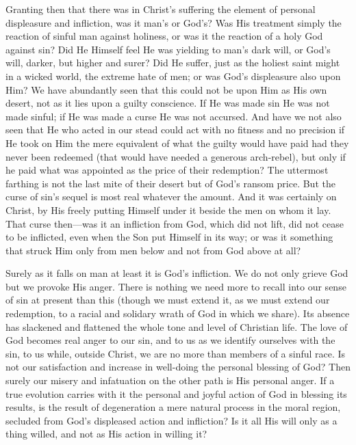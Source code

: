 \documentclass[draft]{ptfdoc}
\begin{document}
Granting then that there was in Christ's suffering the 
element of personal displeasure and infliction, was it man's 
or God's? Was His treatment simply the reaction of 
sinful man against holiness, or was it the reaction of a 
holy God against sin? Did He Himself feel He was 
yielding to man's dark will, or God's will, darker, but 
higher and surer? Did He suffer, just as the holiest 
saint might in a wicked world, the extreme hate of 
men; or was God's displeasure also upon Him? We 
have abundantly seen that this could not be upon Him as 
His own desert, not as it lies upon a guilty conscience. 
If He was made sin He was not made sinful; if He was 
made a curse He was not accursed. And have we not 
also seen that He who acted in our stead could act with 
no fitness and no precision if He took on Him the mere 
equivalent of what the guilty would have paid had they 
never been redeemed (that would have needed a generous 
arch-rebel), but only if he paid what was appointed as the 
price of their redemption? The uttermost farthing is not 
the last mite of their desert but of God's ransom price. 
But the curse of sin's sequel is most real whatever the 
amount. And it was certainly on Christ, by His freely 
putting Himself under it beside the men on whom it lay. 
That curse then---was it an infliction from God, which did 
not lift, did not cease to be inflicted, even when the Son 
put Himself in its way; or was it something that struck 
Him only from men below and not from God above 
at all? 

Surely as it falls on man at least it is God's infliction. 
We do not only grieve God but we provoke His anger. 
There is nothing we need more to recall into our sense of 
sin at present than this (though we must extend it, as we 
must extend our redemption, to a racial and solidary 
wrath of God in which we share). Its absence has 
slackened and flattened the whole tone and level of 
Christian life. The love of God becomes real anger to 
our sin, and to us as we identify ourselves with the sin, 
to us while, outside Christ, we are no more than members 
of a sinful race. Is not our satisfaction and increase in 
well-doing the personal blessing of God? Then surely our 
misery and infatuation on the other path is His personal 
anger. If a true evolution carries with it the personal 
and joyful action of God in blessing its results, is the 
result of degeneration a mere natural process in the 
moral region, secluded from God's displeased action and 
infliction? Is it all His will only as a thing willed, and 
not as His action in willing it? 
\end{document}
